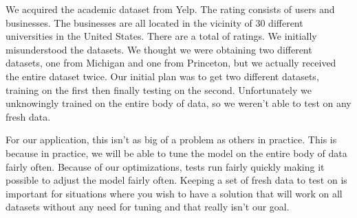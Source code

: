 We acquired the academic dataset from Yelp. The rating consists of \numUserTotal
users and \numBusTotal businesses. The businesses are all located in the vicinity of $30$ different
universities in the United States. There are a total of \numRatingTotal ratings. We initially
misunderstood the datasets. We thought we were obtaining two different
datasets, one from Michigan and one from Princeton, but we actually received the
entire dataset twice. Our initial plan was to get two different datasets,
training on the first then finally testing on the second. Unfortunately we
unknowingly trained on the entire body of data, so we weren't able to test on
any fresh data. 

For our application, this isn't as big of a problem as others in practice. This
is because in practice, we will be able to tune the model on the entire body of
data fairly often. Because of our optimizations, tests run fairly quickly making
it possible to adjust the model fairly often. Keeping a set of fresh data to
test on is important for situations where you wish to have a solution that will
work on all datasets without any need for tuning and that really isn't our goal.

